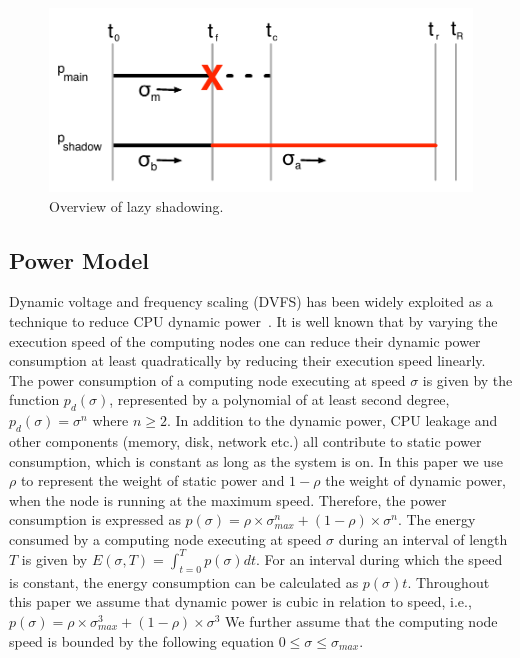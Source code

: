 \begin{figure}[hHtb]
\centering
\includegraphics[width=\columnwidth]{figures/shadow_main_diagram.pdf}
\caption { Overview of lazy shadowing.}
\label{shadow_overview}
\end{figure}


\subsection{Power Model}
\label{power_model}
Dynamic voltage and frequency scaling
(DVFS) has
been widely exploited as a technique to reduce CPU dynamic power~\cite{flautner_2002_APS,pillai_2001_sosp}.
It is well known that by varying the execution speed of the computing
nodes one can reduce their dynamic power consumption at least quadratically by
reducing their execution speed linearly. The power consumption of a
computing node executing at speed $\sigma$ is given by the function
$p_d(\sigma)$, represented by a polynomial of at least second degree,
$p_d(\sigma)=\sigma^n$ where $n\geq2$. 
In addition to the dynamic power, CPU leakage and other components
(memory, disk, network etc.) all contribute to static power
consumption, which is constant as long as the system is on. In this paper we
use $\rho$ to represent the weight of static power and $1-\rho$ the weight 
of dynamic power, when the node is running at the maximum speed.
Therefore, the power consumption is expressed as $p(\sigma)=\rho \times \sigma_{max}^n + (1-\rho)\times \sigma^n$.
The energy consumed by a
computing node executing at speed $\sigma$ during an interval of
length $T$ is given by $E(\sigma,T)=\int_{t=0}^T
p(\sigma)dt$. For an interval during which the speed is constant, the 
energy consumption can be calculated as $p(\sigma)t$. Throughout this paper
we assume that dynamic power is cubic in relation to speed, i.e., 
$p(\sigma)=\rho \times \sigma_{max}^3 + (1-\rho)\times \sigma^3$
We further assume that the computing node speed is bounded by the
following equation $0\leq\sigma\leq\sigma_{max}$.

